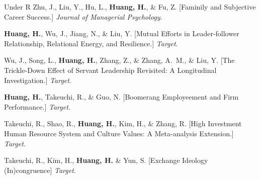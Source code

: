 \documentclass[11pt,letterpaper]{report} %
\begin{document}
    \begin{tablist}

        \item[Under R] \tab{}Zhu, J., Liu, Y., Hu, L., \textbf{Huang, H.}, \& Fu, Z. [Faminily and Subjective Career Success.] \textit{Journal of Managerial Psychology}.
        \item[] \tab{}\textbf{Huang, H.}, Wu, J., Jiang, N., \& Liu, Y. [Mutual Efforts in Leader-follower Relationship, Relational Energy, and Resilience.] \textit{Target}.
        \item[] \tab{}Wu, J., Song, L., \textbf{Huang, H.},  Zhang, Z., \& Zhang, A.~M., \& Liu, Y. [The Trickle-Down Effect of Servant Leadership Revisited: A Longitudinal Investigation.]  \textit{Target}.
        \item[] \tab{}\textbf{Huang, H.}, Takeuchi, R., \& Guo, N. [Boomerang Employeement and Firm Performance.] \textit{Target}.
        \item[] \tab{}Takeuchi, R., Shao, R., \textbf{Huang, H.}, Kim, H., \& Zhang, R. [High Investment Human Resource System and Culture Values: A Meta-analysis Extension.] \textit{Target}.
        \item[] \tab{}Takeuchi, R., Kim, H., \textbf{Huang, H.} \& Yun, S. [Exchange Ideology (In)congruence] \textit{Target}.


    \end{tablist}










\end{document}
